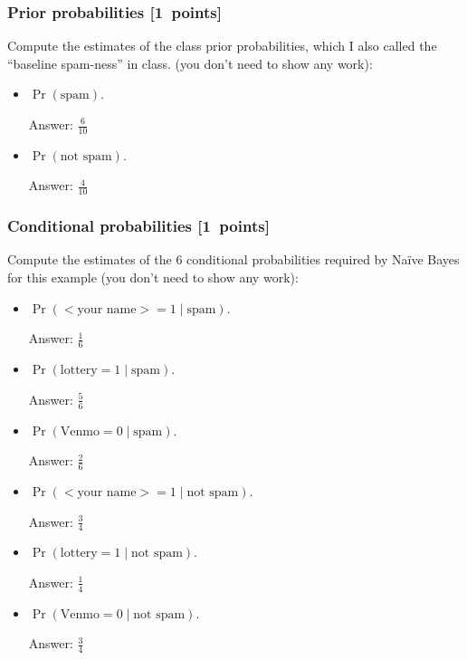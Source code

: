 \documentclass{article}
\newcommand{\blu}[1]{{\textcolor{blu}{#1}}}
\newenvironment{answer}{\par\begingroup\color{gre}Answer: }{\endgroup}
\let\ask\blu
\newcommand\pts[1]{\textcolor{pointscolour}{[#1~points]}}
\begin{document}
    \subsubsection{Prior probabilities \pts{1}}
    \ask{Compute the estimates of the class prior probabilities, which I also called the ``baseline spam-ness'' in class.} (you don't need to show any work):
    \begin{itemize}
        \item $\Pr(\text{spam})$.
        \begin{answer}
        $\frac{6}{10}$
        \end{answer}
        \item $\Pr(\text{not spam})$.
        \begin{answer}
        $\frac{4}{10}$
        \end{answer}
    \end{itemize}

    \subsubsection{Conditional probabilities \pts{1}}

    \ask{Compute the estimates of the 6 conditional probabilities required by Na\"ive Bayes for this example}  (you don't need to show any work):
    \begin{itemize}
        \item $\Pr(\text{$<$your name$>$} = 1  \mid \text{spam})$.
        \begin{answer}
        $\frac{1}{6}$
        \end{answer}
        \item $\Pr(\text{lottery} = 1 \mid \text{spam})$.
        \begin{answer}
        $\frac{5}{6}$
        \end{answer}
        \item $\Pr(\text{Venmo} = 0  \mid \text{spam})$.
        \begin{answer}
        $\frac{2}{6}$
        \end{answer}
        \item $\Pr(\text{$<$your name$>$} = 1  \mid \text{not spam})$.
        \begin{answer}
        $\frac{3}{4}$
        \end{answer}
        \item $\Pr(\text{lottery} = 1  \mid \text{not spam})$.
        \begin{answer}
        $\frac{1}{4}$
        \end{answer}
        \item $\Pr(\text{Venmo} = 0  \mid \text{not spam})$.
        \begin{answer}
        $\frac{3}{4}$
        \end{answer}
    \end{itemize}
\end{document}
